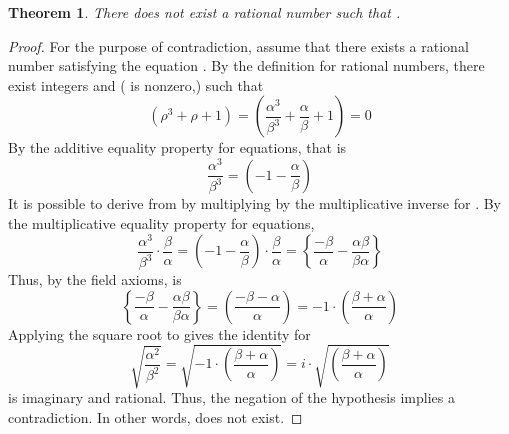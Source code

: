 \documentclass[preview]{standalone}
\newtheorem{theorem}{Theorem}
\begin{document}
\begin{theorem} %
    There does not exist a rational number \bm{$\rho$} such that 
    .
\end{theorem}

\begin{proof}
    For the purpose of contradiction, 
    assume that there exists a rational number \bm{$\rho$} satisfying the equation 
    . 
    By the definition for rational numbers, 
    there exist integers \bm{$\alpha$} and \bm{$\beta$} (\bm{$\beta$} is nonzero,) such that 
    \begin{equation*}
        \left( 
            \rho ^3 + \rho + 1 
        \right) 
            = 
        \left( 
            \frac{\alpha^3}{\beta^3} + \frac{\alpha}{\beta} + 1 
        \right) 
            = 
        0
    \end{equation*}
    By the additive equality property for equations, that is
    \begin{equation*}
        \frac{\alpha^3}{\beta^3} 
            = 
        \left(
            -1 - \frac{\alpha}{\beta}
        \right)
    \end{equation*}
    It is possible to derive  from  
    by multiplying  by the multiplicative inverse for \bm{$\rho$}. 
    By the multiplicative equality property for equations,
    \begin{equation*}
        \frac{\alpha^3}{\beta^3} \cdot \frac{\beta}{\alpha}
            =
        \left(
            -1 - \frac{\alpha}{\beta}
        \right) 
            \cdot 
        \frac{\beta}{\alpha} 
            =
        \left\{
            \frac{-\beta}{\alpha} 
                - 
            \frac{\alpha \beta}{\beta \alpha}
        \right\}
    \end{equation*}
    Thus, by the field axioms,  is
    \begin{equation*}
        \left\{
            \frac{-\beta}{\alpha} 
                - 
            \frac{\alpha \beta}{\beta \alpha}
        \right\}
            = 
        \left(
            \frac{-\beta - \alpha}{\alpha}
        \right)
            = 
        -1 
            \cdot 
        \left( 
            \frac{\beta + \alpha}{\alpha}
        \right)
    \end{equation*}
    Applying the square root to  gives the identity for \bm{$\rho$}
    \begin{equation*}
        \sqrt{ \frac{\alpha^2}{\beta^2} } 
            =
        \sqrt{ -1 \cdot \left( \frac{\beta + \alpha}{\alpha} \right) } 
            =
        i \cdot \sqrt{ \left( \frac{\beta + \alpha}{\alpha} \right) }
    \end{equation*}
    \bm{$\rho$} is imaginary and rational. 
    Thus, the negation of the hypothesis implies a contradiction. 
    In other words, \bm{$\rho$} does not exist.
\end{proof}
\end{document}
